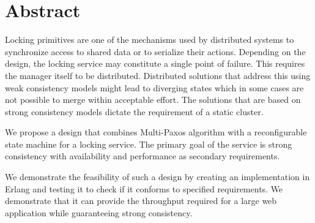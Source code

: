 \chapter{Abstract}

Locking primitives are one of the mechanisms used by distributed systems
to synchronize access to shared data or to serialize their actions. Depending
on the design, the locking service may constitute
a single point of failure. This requires the manager itself to be
distributed. Distributed solutions that address this using weak consistency
models might lead to diverging states which in some cases are not possible to
merge within acceptable effort. The solutions that are based on strong
consistency models dictate the requirement of a static cluster.

We propose a design that combines Multi-Paxos algorithm with a
reconfigurable state machine for a locking service. The primary goal of
the service is strong consistency with availability and performance as
secondary requirements.

We demonstrate the feasibility of such a design by creating an implementation
in Erlang and testing it to check if it conforms to specified requirements.
We demonstrate that it can provide the throughput required for a large
web application while guaranteeing strong consistency.
